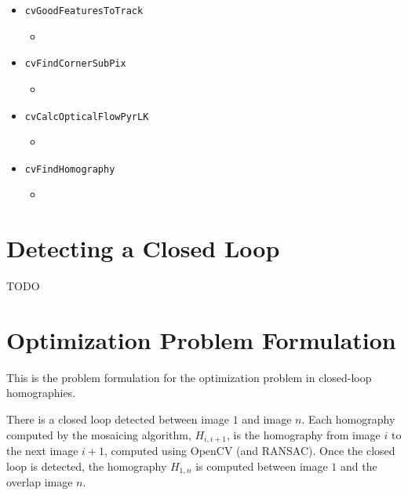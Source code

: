 \documentclass{article}
\begin{document}
\begin{itemize}

\item \verb|cvGoodFeaturesToTrack|

\begin{itemize}

\item  

\end{itemize} 

\item \verb|cvFindCornerSubPix|

\begin{itemize}

\item  

\end{itemize} 

\item \verb|cvCalcOpticalFlowPyrLK|

\begin{itemize}

\item   

\end{itemize} 

\item \verb|cvFindHomography|

\begin{itemize}

\item  

\end{itemize} 

\end{itemize}

\section{Detecting a Closed Loop}

TODO

\section{Optimization Problem Formulation}

This is the problem formulation for the optimization problem in closed-loop
homographies.

There is a closed loop detected between image $1$ and image $n$. Each
homography computed by the mosaicing algorithm, $H_{i, i + 1}$, is the
homography from image $i$ to the next image $i + 1$, computed using OpenCV (and
RANSAC). Once the closed loop is detected, the homography $H_{1, n}$ is
computed between image $1$ and the overlap image $n$. 
\end{document}
